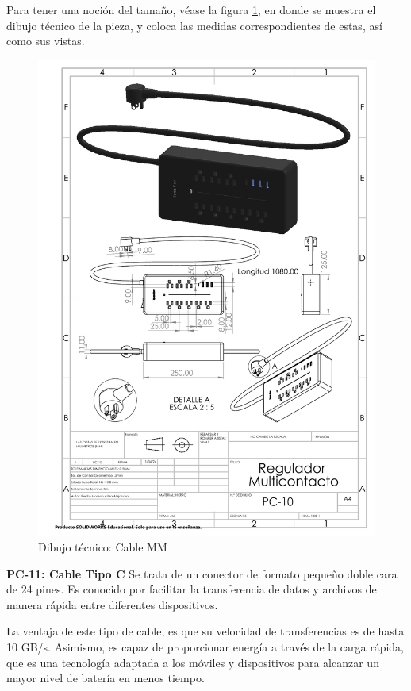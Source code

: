     
    Para tener una noción del tamaño, véase la figura \ref{fig:multicontacto}, en donde se muestra el dibujo técnico de la pieza, y coloca las medidas correspondientes de estas, así como sus vistas.
    \begin{figure}[H]
        \centering
        \includegraphics[trim = {23mm 70mm 15mm 108mm},clip,scale=0.4]{22/Img/multicontactoDibujo.pdf}
        \caption{Dibujo técnico: Cable MM}
        \label{fig:multicontacto}
    \end{figure}
    
    \textbf{PC-11: Cable Tipo C }
    Se trata de un conector de formato pequeño doble cara de 24 pines. Es conocido por facilitar la transferencia de datos y archivos de manera rápida entre diferentes dispositivos.
    
    La ventaja de este tipo de cable, es que su velocidad de transferencias es de hasta 10 GB/s. Asimismo, es capaz de proporcionar energía a través de la carga rápida, que es una tecnología adaptada a los móviles y dispositivos para alcanzar un mayor nivel de batería en menos tiempo.
    
